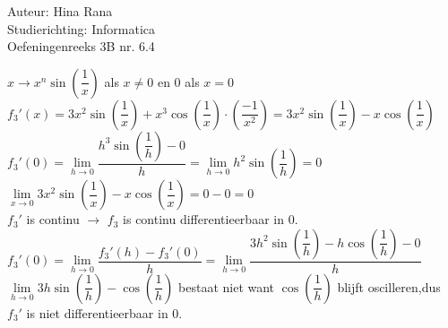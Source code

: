 \documentclass[a4paper]{article}
\begin{document}
\noindent \large Auteur: Hina Rana \\
\noindent \large Studierichting: Informatica\\
\noindent \large Oefeningenreeks 3B nr. 6.4\\

\medskip

\normalsize

$x \to x^n \sin\left(\dfrac{1}{x}\right)$ als $x \neq 0$ en $0$ als $x = 0$\\


$f_3'(x) = 3x^2 \sin\left(\dfrac{1}{x}\right)+ x^3 \cos\left(\dfrac{1}{x}\right) \cdot \left(\dfrac{-1}{x^2}\right) = 3x^2 \sin \left(\dfrac{1}{x}\right) - x \cos \left(\dfrac{1}{x}\right)$\\


$f_3'(0) = \lim\limits_{h \to 0} \dfrac{h^3 \sin\left(\dfrac{1}{h}\right) - 0}{h} = \lim\limits_{h \to 0} h^2 \sin\left(\dfrac{1}{h}\right) = 0$\\


$\lim\limits_{x \to 0} 3x^2 \sin\left(\dfrac{1}{x}\right) - x \cos\left(\dfrac{1}{x}\right) = 0 - 0 = 0$\\


$f_3'$ is continu $\to$ $f_3$ is continu differentieerbaar in $0$.\\


$f_3'(0) = \lim\limits_{h \to 0} \dfrac{f_3'(h) - f_3'(0)}{h} = \lim\limits_{h \to 0} \dfrac{3h^2 \sin\left(\dfrac{1}{h}\right)-h \cos\left(\dfrac{1}{h}\right)-0}{h}$\\


$\lim\limits_{h \to 0} 3h \sin\left(\dfrac{1}{h}\right) - \cos\left(\dfrac{1}{h}\right)$ bestaat niet want $\cos \left(\dfrac{1}{h}\right)$ blijft oscilleren,dus $f_3'$ is niet differentieerbaar in $0$.
\end{document}
